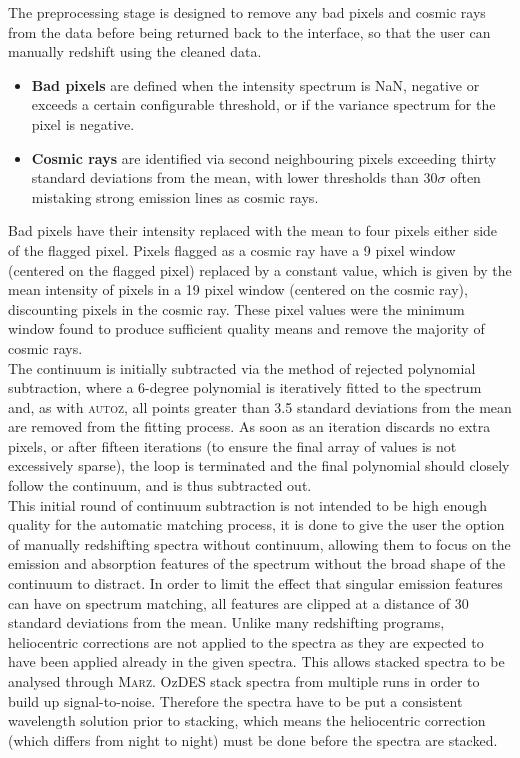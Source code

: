 \documentclass[iop]{emulateapj}
\newcommand{\autoz}{\textsc{autoz}}
\newcommand{\marz}{\textsc{Marz}}
\begin{document}
The preprocessing stage is designed to remove any bad pixels and cosmic rays from the data before being returned back to the interface, so that the user can manually redshift using the cleaned data.
\begin{itemize}
\item \textbf{Bad pixels} are defined when the intensity spectrum is NaN, negative or exceeds a certain configurable threshold, or if the variance spectrum for the pixel is negative.
\item \textbf{Cosmic rays} are identified via second neighbouring pixels exceeding thirty standard deviations from the mean, with lower thresholds than $30\sigma$ often mistaking strong emission lines as cosmic rays. 
\end{itemize}
Bad pixels have their intensity replaced with the mean to four pixels either side of the flagged pixel. Pixels flagged as a cosmic ray have a 9 pixel window (centered on the flagged pixel) replaced by a constant value, which is given by the mean intensity of pixels in a 19 pixel window (centered on the cosmic ray), discounting pixels in the cosmic ray. These pixel values were the minimum window found to produce sufficient quality means and remove the majority of cosmic rays.\\

The continuum is initially subtracted via the method of rejected polynomial subtraction, where a 6-degree polynomial is iteratively fitted to the spectrum and, as with \autoz{}, all points greater than 3.5 standard deviations from the mean are removed from the fitting process. As soon as an iteration discards no extra pixels, or after fifteen iterations (to ensure the final array of values is not excessively sparse), the loop is terminated and the final polynomial should closely follow the continuum, and is thus subtracted out.\\

This initial round of continuum subtraction is not intended to be high enough quality for the automatic matching process, it is done to give the user the option of manually redshifting spectra without continuum, allowing them to focus on the emission and absorption features of the spectrum without the broad shape of the continuum to distract. In order to limit the effect that singular emission features can have on spectrum matching, all features are clipped at a distance of 30 standard deviations from the mean. Unlike many redshifting programs, heliocentric corrections are not applied to the spectra as they are expected to have been applied already in the given spectra. This allows stacked spectra to be analysed through \marz{}. OzDES stack spectra from multiple runs in order to build up signal-to-noise. Therefore the spectra have to be put a consistent wavelength solution prior to stacking, which means the heliocentric correction (which differs from night to night) must be done before the spectra are stacked.\\
\end{document}
